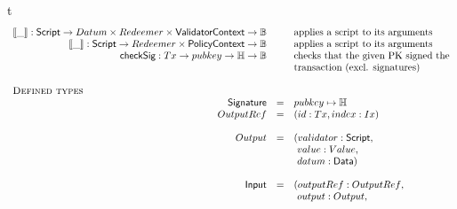 \begin{ruledfigure}{t}
\begin{displaymath}
\begin{array}{rll}
      \applyScript{\_}: \Script \rightarrow \Datum \times \Redeemer \times \vlctx \rightarrow \B && \mbox{applies a script to its arguments}\\
      \applyMPScript{\_}: \Script \rightarrow \Redeemer \times \mpsctx \rightarrow \B && \mbox{applies a script to its arguments}\\
      \checkSig : \eutxotx \to \pubkey \to \H \to \B && \mbox{checks that the given PK signed the} \\
      && \mbox{transaction (excl. signatures)}\\
\\
    \multicolumn{3}{l}{\textsc{Defined types}}\\
    \Signature &=& \pubkey \mapsto \H\\
    \OutputRef &= &(\txrefid: \Tx, \idx: \Ix)\\ %
    \\
    \Output &=&( \validator: \Script,\\
                & &\ \val : \Value, \\
                & &\ \datum: \Data )\\
    \\
    \Input &=&( \outputref: \sf{OutputRef},\\
                & &\ \fun{output}: \Output, \\

\end{array}
\end{displaymath}
\end{ruledfigure}
